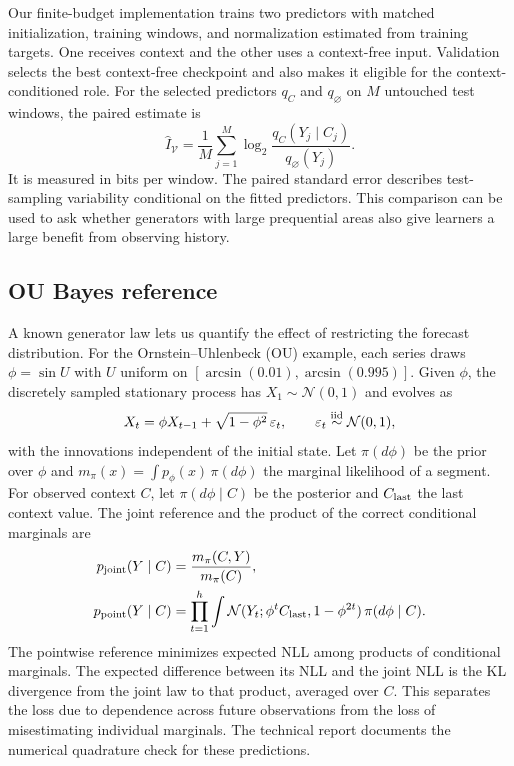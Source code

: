 \documentclass[10pt,a4paper]{article}
\theoremstyle{definition}
\begin{document}
Our finite-budget implementation trains two predictors with matched
initialization, training windows, and normalization estimated from
training targets. One receives context and the other uses a context-free
input. Validation selects the best context-free checkpoint and also makes
it eligible for the context-conditioned role. For the selected predictors
$q_C$ and $q_\varnothing$ on $M$ untouched test windows, the paired estimate is
\[
 \widehat I_{\mathcal V}=\frac{1}{M}\sum_{j=1}^M
 \log_2\frac{q_C(Y_j\mid C_j)}{q_{\varnothing}(Y_j)}.
\]
It is measured in bits per window. The paired standard error describes
test-sampling variability conditional on the fitted predictors. This
comparison can be used to ask whether generators with large prequential
areas also give learners a large benefit from observing history.

\subsection{OU Bayes reference}\label{sec:ou-bayes}
A known generator law lets us quantify the effect of restricting the
forecast distribution. For the Ornstein--Uhlenbeck (OU) example, each
series draws $\phi=\sin U$ with $U$ uniform on
$[\arcsin(0.01),\arcsin(0.995)]$. Given $\phi$, the discretely sampled
stationary process has $X_1\sim\mathcal N(0,1)$ and evolves as
\[
 X_t=\phi X_{t-1}+\sqrt{1-\phi^2}\,\varepsilon_t,\qquad
 \varepsilon_t\overset{\rm iid}{\sim}\mathcal N(0,1),
\]
with the innovations independent of the initial state.
Let $\pi(d\phi)$ be the prior over $\phi$ and
$m_\pi(x)=\int p_\phi(x)\,\pi(d\phi)$ the marginal likelihood of a segment.
For observed context $C$, let $\pi(d\phi\mid C)$ be the posterior and
$C_{\rm last}$ the last context value. The joint reference and the product
of the correct conditional marginals are
\begin{equation}
 \begin{aligned}
 p_{\rm joint}(Y\mid C)&=\frac{m_\pi(C,Y)}{m_\pi(C)},\\
 p_{\rm point}(Y\mid C)&=\prod_{t=1}^h
 \int\mathcal N(Y_t;\phi^t C_{\rm last},1-\phi^{2t})\,\pi(d\phi\mid C).
 \end{aligned}
 \label{eq:ou-reference}
\end{equation}
The pointwise reference minimizes expected NLL among products of
conditional marginals. The expected difference between its NLL and the
joint NLL is the KL divergence from the joint law to that product,
averaged over $C$. This separates the loss due to dependence across future
observations from the loss of misestimating individual marginals. The
technical report documents the numerical quadrature check for these
predictions.
\end{document}
